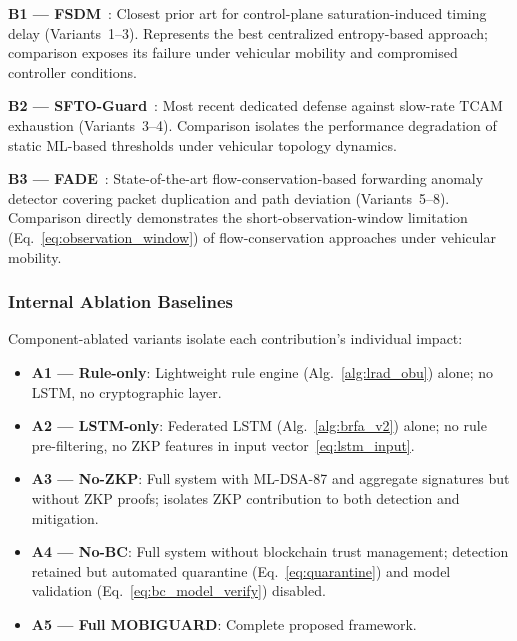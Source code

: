 \documentclass[12pt, a4paper]{report}
\begin{document}
{{\textbf{B1 — FSDM}~\cite{Huang2020}: Closest prior art for
control-plane saturation-induced timing delay (Variants~1--3).
Represents the best centralized entropy-based approach; comparison
exposes its failure under vehicular mobility and compromised controller
conditions.

\textbf{B2 — SFTO-Guard}~\cite{Tang2023SFTO}: Most recent dedicated
defense against slow-rate TCAM exhaustion (Variants~3--4). Comparison
isolates the performance degradation of static ML-based thresholds
under vehicular topology dynamics.

\textbf{B3 — FADE}~\cite{Zhang2021FADE}: State-of-the-art
flow-conservation-based forwarding anomaly detector covering packet
duplication and path deviation (Variants~5--8). Comparison directly
demonstrates the short-observation-window limitation
(Eq.~\eqref{eq:observation_window}) of flow-conservation approaches
under vehicular mobility.

\subsubsection{Internal Ablation Baselines}
Component-ablated variants isolate each contribution's individual
impact:

\begin{itemize}
    \item \textbf{A1 — Rule-only}: Lightweight rule engine
    (Alg.~\ref{alg:lrad_obu}) alone; no LSTM, no cryptographic layer.
    \item \textbf{A2 — LSTM-only}: Federated LSTM
    (Alg.~\ref{alg:brfa_v2}) alone; no rule pre-filtering, no ZKP
    features in input vector~\eqref{eq:lstm_input}.
    \item \textbf{A3 — No-ZKP}: Full system with ML-DSA-87 and aggregate
    signatures but without ZKP proofs; isolates ZKP contribution to
    both detection and mitigation.
    \item \textbf{A4 — No-BC}: Full system without blockchain trust
    management; detection retained but automated quarantine
    (Eq.~\eqref{eq:quarantine}) and model validation
    (Eq.~\eqref{eq:bc_model_verify}) disabled.
    \item \textbf{A5 — Full MOBIGUARD}: Complete proposed framework.
\end{itemize}


}}
\end{document}
